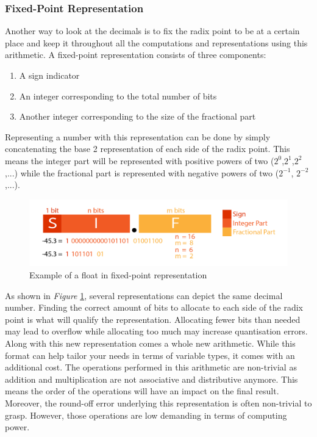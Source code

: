\subsubsection{Fixed-Point Representation}

Another way to look at the decimals is to fix the radix point to be at a certain place and keep it throughout all the computations and representations using this arithmetic. A fixed-point representation consists of three components:
\begin{enumerate}
  \item A sign indicator
  \item An integer corresponding to the total number of bits
  \item Another integer corresponding to the size of the fractional part
\end{enumerate}

Representing a number with this representation can be done by simply concatenating the base 2 representation of each side of the radix point. This means the integer part will be represented with positive powers of two ($2^0$,$2^1$,$2^2$,...) while the fractional part is represented with negative powers of two ($2^{-1}$, $2^{-2}$,...).

\begin{figure}[htbp]
	\centering
		\includegraphics[width=.8\textwidth]{Figures/FixedPoint.png}
	\caption[Fixed-Point Representation]{Example of a float in fixed-point representation}
	\label{fig:FixedPoint}
\end{figure}

As shown in \emph{Figure} \ref{fig:FixedPoint}, several representations can depict the same decimal number. Finding the correct amount of bits to allocate to each side of the radix point is what will qualify the representation. Allocating fewer bits than needed may lead to overflow while allocating too much may increase quantisation errors.
Along with this new representation comes a whole new arithmetic. While this format can help tailor your needs in terms of variable types, it comes with an additional cost. The operations performed in this arithmetic are non-trivial as addition and multiplication are not associative and distributive anymore. This means the order of the operations will have an impact on the final result. Moreover, the round-off error underlying this representation is often non-trivial to grasp. However, those operations are low demanding in terms of computing power.

